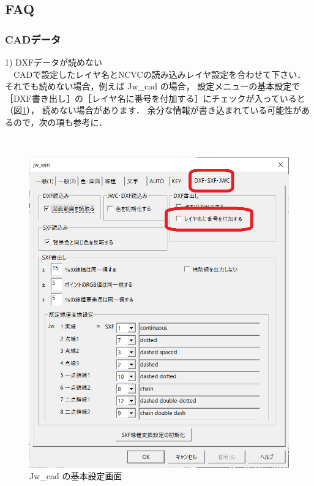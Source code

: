 
\subsection{FAQ}

\subsubsection{CADデータ}

\begin{minipage}[t]{0.48\textwidth}
1) DXFデータが読めない\\
　CADで設定したレイヤ名とNCVCの読み込みレイヤ設定を合わせて下さい．
それでも読めない場合，例えば Jw\_cad の場合，
設定メニューの基本設定で［DXF書き出し］の［レイヤ名に番号を付加する］にチェックが入っていると（図\ref{fig:jw-dxf.png}），
読めない場合があります．
余分な情報が書き込まれている可能性があるので，次の項も参考に．
\end{minipage}
\begin{minipage}[t]{0.02\textwidth}
　
\end{minipage}
\begin{minipage}[t]{0.5\textwidth}
\vspace*{-2zh}
\begin{figure}[H]
\centering
\includegraphics[width=\textwidth]{No7/fig/jw-dxf.png}
\caption{Jw\_cad の基本設定画面}
\label{fig:jw-dxf.png}
\end{figure}
\end{minipage}

